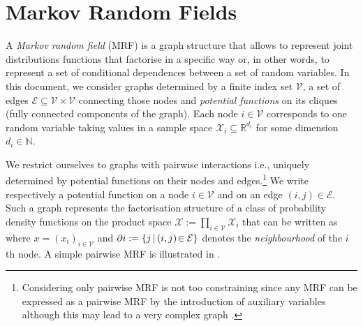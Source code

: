 \section{\label{subsection: mrf}Markov Random Fields}
A \emph{Markov random field} (MRF) is a graph structure that allows to represent joint distributions functions that factorise in a specific way or, in other words, to represent a set of conditional dependences between a set of random variables. In this document, we consider graphs determined by a finite index set $\mathcal V$, a set of edges $\mathcal E\subseteq \mathcal V\times \mathcal V$ connecting those nodes and \emph{potential functions} on its cliques (fully connected components of the graph). Each node $i\in\mathcal V$ corresponds to one random variable taking values in a sample space $\mathcal X_i \subseteq\mathbb R^{d_i}$ for some dimension $d_i\in\mathbb N$. 

We restrict ourselves to graphs with pairwise interactions i.e., uniquely determined by potential functions on their nodes and edges.\footnote{Considering only pairwise MRF is not too constraining since any MRF can be expressed as a pairwise MRF by the introduction of auxiliary variables although this may lead to a very complex graph \citep{yedidia00, wainwright08}.}
We write
%
% 
respectively a potential function on a node $i\in \mathcal V$ and on an edge $(i,j)\in \mathcal E$. 
Such a graph represents the factorisation structure of a class of probability density functions on the product space $\mathcal X := \prod_{i\in \mathcal V}\mathcal X_{i}$ that can be written as
where $x=(x_{i})_{i\in \mathcal V}$ and $\partial i:=\{j\,|\, (i,j)\!\in\,\!\mathcal E\}$ denotes the \emph{neighbourhood} of the $i$th node. 
A simple pairwise MRF is illustrated in .\\

